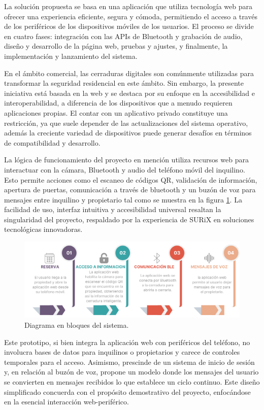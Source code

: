 \documentclass[
11pt, %
codirector, %
]{charter}
\begin{document}
La solución propuesta se basa en una aplicación que utiliza tecnología web para ofrecer una experiencia eficiente, segura y cómoda, permitiendo el acceso a través de los periféricos de los dispositivos móviles de los usuarios. El proceso se divide en cuatro fases: integración con las APIs de Bluetooth y grabación de audio, diseño y desarrollo de la página web, pruebas y ajustes, y finalmente, la implementación y lanzamiento del sistema.

En el ámbito comercial, las cerraduras digitales son comúnmente utilizadas para transformar la seguridad residencial en este ámbito. Sin embargo, la presente iniciativa está basada en la web y se destaca por su enfoque en la accesibilidad e interoperabilidad, a diferencia de los dispositivos que a menudo requieren aplicaciones propias. El contar con un aplicativo privado constituye una restricción, ya que suele depender de las actualizaciones del sistema operativo, además la creciente variedad de dispositivos puede generar desafíos en términos de compatibilidad y desarrollo.

La lógica de funcionamiento del proyecto en mención utiliza recursos web para interactuar con la cámara, Bluetooth y audio del teléfono móvil del inquilino. Esto permite acciones como el escaneo de códigos QR, validación de información, apertura de puertas, comunicación a través de bluetooth y un buzón de voz para mensajes entre inquilino y propietario tal como se muestra en la figura \ref{fig:diagBloques}. La facilidad de uso, interfaz intuitiva y accesibilidad universal resaltan la singularidad del proyecto, respaldado por la experiencia de SURiX en soluciones tecnológicas innovadoras.

\begin{figure}[htpb]
\centering 
\includegraphics[width=1\textwidth]{./Figuras/flowchart.png}
\caption{Diagrama en bloques del sistema.}
\label{fig:diagBloques}
\end{figure}

Este prototipo, si bien integra la aplicación web con periféricos del teléfono, no involucra bases de datos para inquilinos o propietarios y carece de controles temporales para el acceso. Asimismo, prescinde de un sistema de inicio de sesión y, en relación al buzón de voz, propone un modelo donde los mensajes del usuario se convierten en mensajes recibidos lo que establece un ciclo continuo. Este diseño simplificado concuerda con el propósito demostrativo del proyecto, enfocándose en la esencial interacción web-periférico.  
\end{document}

